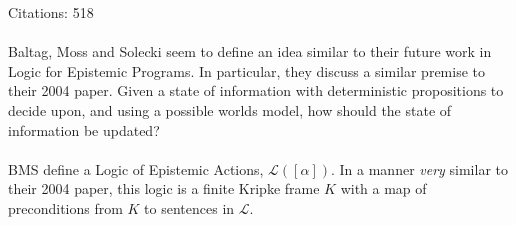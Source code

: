 \documentclass[10pt, a4paper, twoside]{article}
\begin{document}
Citations: 518\\
\\
Baltag, Moss and Solecki seem to define an idea similar to their future work in
Logic for Epistemic Programs.
In particular, they discuss a similar premise to their 2004 paper.
Given a state of information with deterministic propositions to decide upon, and
using a possible worlds model, how should the state of information be updated?\\
\\
BMS define a Logic of Epistemic Actions, $\mathcal{L}([\alpha])$.
In a manner {\em very} similar to their 2004 paper, this logic is a finite
Kripke frame $K$ with a map of preconditions from $K$ to sentences in
$\mathcal{L}$.
\end{document}
